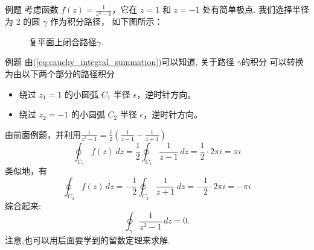 \documentclass[fontset=windows, chinese, 10pt]{beamer}
\begin{document}
  \begin{frame}{例题}
    \small
    考虑函数 \( f(z) = \frac{1}{z^2 - 1} \)，它在 \( z = 1 \) 和 \( z = -1 \) 处有简单极点.
    我们选择半径为 2 的圆 \( \gamma \) 作为积分路径，
    如下图所示：
    \begin{figure}
    \scalebox{0.7}{
   
    }
    \caption{复平面上闭合路径$\gamma$.}
    \end{figure}



  \end{frame}

  \begin{frame}{例题}
    \small
由(\ref{eq:cauchy_integral_summation})可以知道,
    关于路径 \( \gamma \)的积分
    可以转换为由以下两个部分的路径积分
    \begin{itemize}
        \item 绕过 \( z_1 = 1 \) 的小圆弧 \( C_1 \) 半径 \( \epsilon \)，逆时针方向。
        \item 绕过 \( z_2 = -1 \) 的小圆弧 \( C_2 \) 半径 \( \epsilon \)，逆时针方向。
    \end{itemize}

        由前面例题，并利用$\frac{1}{z^2 -1} = \frac{1}{2}\left( \frac{1}{z-1} - \frac{1}{z+1}\right)$
    \[
    \oint_{C_1} f(z) \, dz =\frac{1}{2}\oint_{C_1} \frac{1}{z-1} \, dz =  \frac{1}{2} \cdot 2\pi i  = \pi i
    \]
    类似地，有
    \[
        \oint_{C_2} f(z) \, dz =-\frac{1}{2}\oint_{C_2} \frac{1}{z+1} \, dz =  -\frac{1}{2} \cdot 2\pi i  = -\pi i
    \]
    综合起来:
    \[
        \oint_{\gamma} \frac{1}{z^2 - 1} \, dz = 0.
    \]
    注意,也可以用后面要学到的留数定理来求解.

  \end{frame}
  


\end{document}
